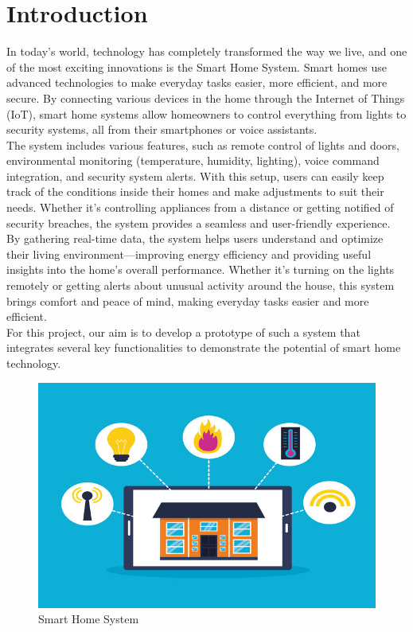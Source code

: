 \section{Introduction}
In today’s world, technology has completely transformed the way we live, and one of the most exciting innovations is the Smart Home System. Smart homes use advanced technologies to make everyday tasks easier, more efficient, and more secure. By connecting various devices in the home through the Internet of Things (IoT), smart home systems allow homeowners to control everything from lights to security systems, all from their smartphones or voice assistants.\\

The system includes various features, such as remote control of lights and doors, environmental monitoring (temperature, humidity, lighting), voice command integration, and security system alerts. With this setup, users can easily keep track of the conditions inside their homes and make adjustments to suit their needs. Whether it’s controlling appliances from a distance or getting notified of security breaches, the system provides a seamless and user-friendly experience.\\

By gathering real-time data, the system helps users understand and optimize their living environment—improving energy efficiency and providing useful insights into the home’s overall performance. Whether it’s turning on the lights remotely or getting alerts about unusual activity around the house, this system brings comfort and peace of mind, making everyday tasks easier and more efficient. \\

For this project, our aim is to develop a prototype of such a system that integrates several key functionalities to demonstrate the potential of smart home technology. 

\begin{figure}[H]
    \centering
    \includegraphics[width=1\linewidth]{Images/1.a.jpg}
    \caption{Smart Home System }
    \label{fig:enter-label}
\end{figure}

 